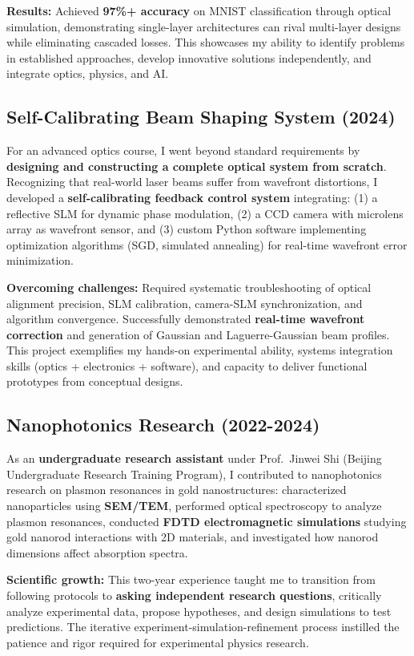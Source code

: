 \documentclass[11pt,a4paper]{article}
\begin{document}
\textbf{Results:} Achieved \textbf{97\%+ accuracy} on MNIST classification through optical simulation, demonstrating single-layer architectures can rival multi-layer designs while eliminating cascaded losses. This showcases my ability to identify problems in established approaches, develop innovative solutions independently, and integrate optics, physics, and AI.

\subsection{Self-Calibrating Beam Shaping System (2024)}

For an advanced optics course, I went beyond standard requirements by \textbf{designing and constructing a complete optical system from scratch}. Recognizing that real-world laser beams suffer from wavefront distortions, I developed a \textbf{self-calibrating feedback control system} integrating: (1) a reflective SLM for dynamic phase modulation, (2) a CCD camera with microlens array as wavefront sensor, and (3) custom Python software implementing optimization algorithms (SGD, simulated annealing) for real-time wavefront error minimization.

\textbf{Overcoming challenges:} Required systematic troubleshooting of optical alignment precision, SLM calibration, camera-SLM synchronization, and algorithm convergence. Successfully demonstrated \textbf{real-time wavefront correction} and generation of Gaussian and Laguerre-Gaussian beam profiles. This project exemplifies my hands-on experimental ability, systems integration skills (optics + electronics + software), and capacity to deliver functional prototypes from conceptual designs.

\subsection{Nanophotonics Research (2022-2024)}

As an \textbf{undergraduate research assistant} under Prof.~Jinwei Shi (Beijing Undergraduate Research Training Program), I contributed to nanophotonics research on plasmon resonances in gold nanostructures: characterized nanoparticles using \textbf{SEM/TEM}, performed optical spectroscopy to analyze plasmon resonances, conducted \textbf{FDTD electromagnetic simulations} studying gold nanorod interactions with 2D materials, and investigated how nanorod dimensions affect absorption spectra.

\textbf{Scientific growth:} This two-year experience taught me to transition from following protocols to \textbf{asking independent research questions}, critically analyze experimental data, propose hypotheses, and design simulations to test predictions. The iterative experiment-simulation-refinement process instilled the patience and rigor required for experimental physics research.
\end{document}
